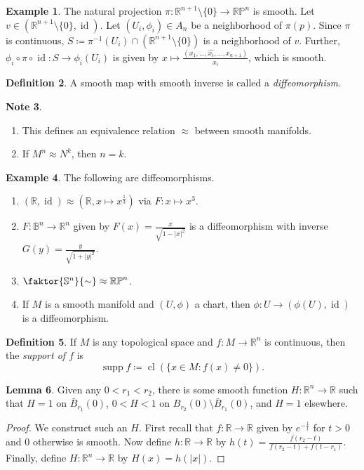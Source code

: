 \documentclass[10pt,letterpaper,cm]{nupset}
\theoremstyle{definition}
\newtheorem{definition}{Definition}[subsection]
\newtheorem{exmp}[definition]{Example}
\newtheorem{note}[definition]{Note}
\theoremstyle{theorem}
\newtheorem{lemma}[definition]{Lemma}
\theoremstyle{remark}
\newcommand{\R}{\mathbb R}
\newcommand{\RP}{\mathbb{RP}}
\renewcommand{\S}{\mathbb S}
\newcommand{\B}{\mathbb{B}}
\newcommand{\1}{\mathbf{1}}
\newcommand{\0}{\vec 0}
\DeclareMathOperator{\id}{id}
\DeclareMathOperator{\supp}{supp}
\DeclareMathOperator{\cl}{cl}
\begin{document}
\begin{exmp}
The natural projection $\pi : \R^{n+1}\setminus \{0\} \to \RP^n$ is smooth. Let $v \in (\R^{n+1} \setminus \{0\}, \id)$. Let $(U_i, \phi_i) \in A_n$ be a neighborhood of $\pi(p)$. Since $\pi$ is continuous, $S \coloneqq  \pi^{-1}(U_i) \cap  (\R^{n+1} \setminus \{0\})$ is a neighborhood of $v$. Further, $\phi_i \circ \pi \circ \id : S \to \phi_i(U_i)$ is given by $x\mapsto \frac{(x_1, \ldots, \widehat{x_i}, \ldots, x_{n+1})}{x_i}$, which is smooth.
\end{exmp}

\begin{definition} 
A smooth map with smooth inverse is called a \textit{diffeomorphism}.
\end{definition}

\begin{note} $ $
\begin{enumerate}
\item This defines an equivalence relation $\approx$ between smooth manifolds. 
\item If $M^n \approx N^k$, then $n =k$.
\end{enumerate}
\end{note}


\begin{exmp}{The following are diffeomorphisms.}
\begin{enumerate}
\item $(\R, \id) \approx (\R, x\mapsto x^{\frac{1}{3}})$ via $F: x \mapsto x^3$.
\item $F: \B^n \to \R^n$ given by $F(x) = \frac{x}{\sqrt{1-|x|^2}}$ is a diffeomorphism with inverse $G(y) = \frac{y}{\sqrt{1+|y|^2}}$.
\item  $\faktor{\S^n}{\sim} \approx \RP^n$.
\item If $M$ is a smooth manifold and $(U, \phi)$ a chart, then $\phi: U \to (\phi(U), \id)$ is a diffeomorphism.
\end{enumerate}
\end{exmp}

\begin{definition}
If $M$ is any topological space and $f:M \to \R^n$ is continuous, then the \textit{support of $f$} is $$\supp f \coloneqq  \cl(\{x \in M: f(x) \ne 0\}).$$
\end{definition}

\begin{lemma}
Given any $0<r_1<r_2$, there is some smooth function $H: \R^n \to \R$ such that $H =1$ on $\bar{B}_{r_1}(0)$, $0<H <1$ on $B_{r_2}(0)\setminus \bar{B}_{r_1}(0)$, and $H=1$ elsewhere. 
\end{lemma}
\begin{proof}\label{l5}
We construct such an $H$. First recall that $f: \R \to \R$ given by $e^{-\frac{1}{t}}$ for $t>0$ and $0$ otherwise is smooth. Now define $h: \R \to \R$ by $h(t) = \frac{f(r_2-t)}{f(r_2-t)+ f(t-r_1)}$. Finally, define $H: \R^n \to \R$ by $H(x) = h(|x|)$.
\end{proof}
\end{document}
